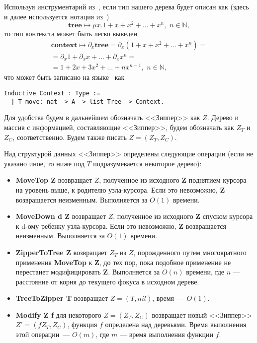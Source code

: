 Используя инструментарий из~\autocite{McBride2009}, если тип нашего дерева будет описан как (здесь и далее используется нотация из~\autocite{McBride2009})
\begin{equation*}
\textbf{tree} \mapsto \mu x. 1 + x + x^2 + \dotsc + x^n, \,\, n \in \mathbb{N},
\end{equation*}   
то тип контекста может быть легко выведен
\begin{multline*}
\textbf{context} \mapsto \partial_x \textbf{tree} = \partial_x \left( 1 + x + x^2 + \dotsc + x^n \right)  = \\
= \partial_x 1 + \partial_x x + \dotsc + \partial_x x^n = \\
= 1 + 2x + 3x^2 + \dotsc + nx^{n-1}, \,\, n \in \mathbb{N},
\end{multline*}
что может быть записано на языке \tcoq~как
\begin{Verbatim}[fontsize=\small]
Inductive Context : Type :=
  | T_move: nat -> A -> list Tree -> Context.
\end{Verbatim}

Для удобства будем в дальнейшем обозначать <<Зиппер>> как $Z$. Дерево и массив с информацией, составляющие <<Зиппер>>, будем обозначать как $Z_T$ и $Z_C$, соответственно. Будем также писать $Z = (Z_T, Z_C)$.

Над структурой данных <<Зиппер>> определены следующие операции (если не указано иное, то ниже под $T$ подразумевается некоторое дерево):
\begin{itemize}
\item \textbf{MoveTop Z} возвращает $Z$, полученное из исходного \textbf{Z} поднятием курсора на уровень выше, к родителю узла-курсора. Если это невозможно, \textbf{Z} возвращается неизменным. Выполняется за $O(1)$ времени.
\item \textbf{MoveDown d Z} возвращает $Z$, полученное из исходного \textbf{Z} спуском курсора к d-ому ребенку узла-курсора. Если это невозможно, \textbf{Z} возвращается неизменным. Выполняется за $O(1)$ времени.
\item \textbf{ZipperToTree Z} возвращает $Z_T$ из $Z$, порожденного путем многократного применения \textbf{MoveTop} к \textbf{Z}, до тех пор, пока подобное применение не перестанет модифицировать \textbf{Z}. Выполняется за $O(n)$ времени, где $n$ --- расстояние от корня до текущего фокуса в исходном дереве.
\item \textbf{TreeToZipper T} возвращает $Z = (T, nil)$, время~--- $O(1)$.
\item \textbf{Modify Z f} для некоторого $Z = (Z_T, Z_C)$ возвращает новый <<Зиппер>> $Z' = (f Z_T, Z_C)$, функция $f$ определена над деревьями. Время выполнения этой операции~--- $O(m)$, где $m$ --- время выполнения функции $f$.  
\end{itemize}

